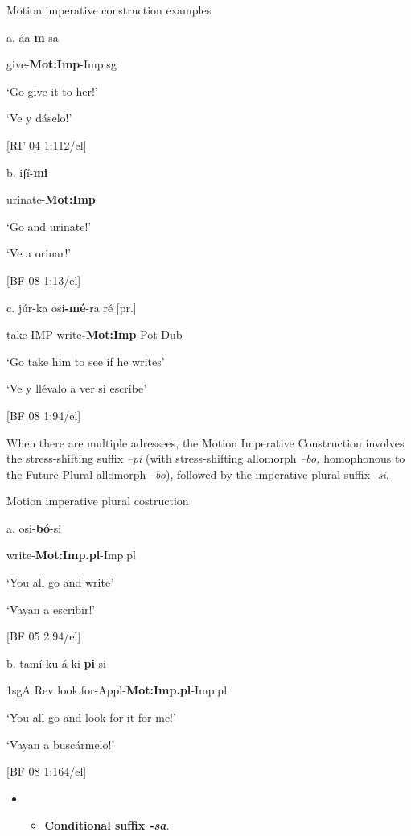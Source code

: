    Motion imperative construction examples

a.   áa-\textbf{m}{}-sa

  give-\textbf{Mot:Imp}{}-Imp:sg

‘Go give it to her!’

‘Ve y dáselo!’            

[RF 04 1:112/el]

b.   iʃí-\textbf{mi}

  urinate-\textbf{Mot:Imp}

  ‘Go and urinate!’

  ‘Ve a orinar!’            

  [BF 08 1:13/el]

c.   júr-ka     osi\textbf{{}-mé}{}-ra ré    [pr.]

take-IMP   write\textbf{{}-Mot:Imp}{}-Pot   Dub

‘Go take him to see if he writes’

‘Ve y llévalo a ver si escribe’        

[BF 08 1:94/el]

  When there are multiple adressees, the Motion Imperative Construction involves the stress-shifting suffix \textit{–pi} (with stress-shifting allomorph \textit{–bo,} homophonous to the Future Plural allomorph \textit{–bo}), followed by the imperative plural suffix \textit{{}-si}. 

  Motion imperative plural costruction

a.   osi-\textbf{bó}{}-si

write-\textbf{Mot:Imp.pl}{}-Imp.pl      

‘You all go and write’  

‘Vayan a escribir!’          

[BF 05 2:94/el]

b.   tamí  ku  á-ki-\textbf{pi}{}-si

    1sgA  Rev  look.for-Appl-\textbf{Mot:Imp.pl}{}-Imp.pl

    ‘You all go and look for it for me!’

‘Vayan a buscármelo!’        

[BF 08 1:164/el]

\begin{itemize}
\item \begin{itemize}
\item \textbf{Conditional suffix \textit{{}-sa}}.
\end{itemize}
\end{itemize}

